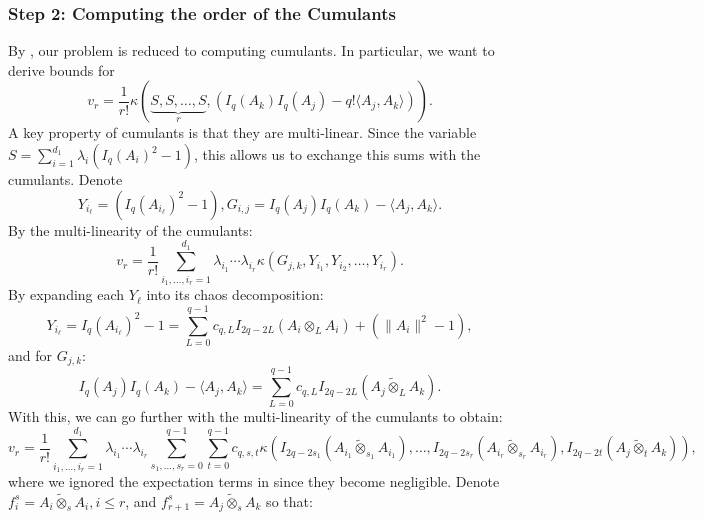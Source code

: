 \documentclass[]{article}
\numberwithin{equation}{section}
\theoremstyle{definition}
\begin{document}
\subsubsection{Step 2: Computing the order of the Cumulants}
\label{section:cumulants}
By , our problem is reduced to computing cumulants. In particular, we want to derive bounds for 
\begin{equation}
    v_{r} = \dfrac{1}{r!} \kappa \left (\underbrace{S, S, \dots, S}_{r}, (I_{q}(A_k)I_{q} (A_j) - q! \langle A_j, A_k \rangle ) \right ). 
\end{equation}
A key property of cumulants is that they are multi-linear. Since the variable $S= \sum_{i=1}^{d_1}\lambda_i (I_{q}(A_i)^{2} -1)$, this allows us to exchange this sums with the cumulants. Denote
\[
Y_{i_\ell} = (I_{q}(A_{i_\ell})^{2} -1), G_{i,j} = I_{q}(A_j) I_{q}(A_k) - \langle A_j, A_k\rangle.
\]
By the multi-linearity of the cumulants: 
\begin{equation}
    v_{r} = \dfrac{1}{r!} \sum_{i_{1}, \dots, i_{r}=1}^{d_1} \lambda_{i_1} \cdots \lambda_{i_r} \kappa \left (G_{j,k}, Y_{i_1}, Y_{i_2}, \dots, Y_{i_r}\right ). 
\end{equation}
By expanding each $Y_{\ell}$ into its chaos decomposition: 
\begin{equation}
    Y_{i_\ell} = I_{q}(A_{i_\ell})^{2} -1 = \sum_{L=0}^{q-1} c_{q,L} I_{2q-2L}(A_{i} \otimes_{L} A_i ) + (\| A_i\|^{2} - 1), 
    \label{eq:quadratic_chaos_expansion}
\end{equation}
and for $G_{j,k}$: 
\begin{equation}
    I_{q}(A_j)I_{q}(A_k) - \langle A_j, A_k\rangle= \sum_{L=0}^{q-1} c_{q,L} I_{2q-2L}(A_{j}\tilde{\otimes}_{L} A_k ). 
\end{equation}
With this, we can go further with the multi-linearity of the cumulants to obtain: 
\begin{equation}
     v_{r} = \dfrac{1}{r!} \sum_{i_{1}, \dots, i_{r}=1}^{d_1} \lambda_{i_1} \cdots \lambda_{i_r} \sum_{s_1, \dots, s_r = 0}^{q-1}\sum_{t = 0}^{q-1} c_{q,s,t }\kappa \left (I_{2q-2s_{1}}(A_{i_1} \tilde{\otimes}_{s_1}A_{i_1}) , \dots,I_{2q-2s_{r}}(A_{i_r} \tilde{\otimes}_{s_r}A_{i_r}), I_{2q-2t}(A_{j}\tilde{\otimes}_{t} A_k )\right ), 
\end{equation}
where we ignored the expectation terms in  since they become negligible.  Denote $f^{s}_i= A_{i} \tilde{\otimes}_{s}A_{i}, i \leq {r}$,  and $f^{s}_{r+1} = A_{j} \tilde{\otimes}_{s}A_{k}$ so that: 
\end{document}
